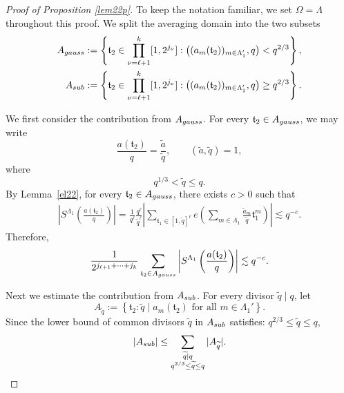 \documentclass[10pt,a4paper]{amsart}
\numberwithin{equation}{section}
\begin{document}
 \begin{proof}[Proof of Proposition \ref{lem22p}] To keep the notation familiar, we set $\Omega=\Lambda$ throughout this proof.
	We split the averaging domain into the two subsets
	\begin{align*}
		A_{\rm gauss}
		&:=
		\left\{
		\mathfrak{t}_2\in
		\prod_{\nu=\ell+1}^k[1,2^{j_\nu}]
		:
		\bigl((a_m(\mathfrak{t}_2))_{m\in\Lambda_1'},q\bigr)
		<
		q^{2/3}
		\right\},\\
		A_{\rm sub}
		&:=
		\left\{
		\mathfrak{t}_2\in
		\prod_{\nu=\ell+1}^k[1,2^{j_\nu}]
		:
		\bigl((a_m(\mathfrak{t}_2))_{m\in\Lambda_1'},q\bigr)
		\ge
		q^{2/3}
		\right\}.
	\end{align*}
	
	We first consider the contribution from $A_{\rm gauss}$.
	For every $\mathfrak t_2\in A_{\rm gauss}$, we may write
	\[
	\frac{a(\mathfrak t_2)}{q}
	=
	\frac{\widetilde a}{\widetilde q},
	\qquad
	(\widetilde a,\widetilde q)=1,
	\]
	where
	\[
	q^{1/3}< \widetilde q\le q.
	\]
By	 Lemma~\ref{el22}, for every $\mathfrak t_2\in A_{\rm gauss}$, there exists $c>0$ such that
	\begin{align*}
		\left|
		S^{\Lambda_1}
		\left(
		\frac{a(\mathfrak t_2)}{q}
		\right)
		\right|
		=
		\frac1{q^\ell}
		\frac{q^\ell}{\widetilde q^\ell}
		\left|
		\sum_{\mathfrak t_1\in[1,\widetilde q]^\ell}
		e\!\left(
		\sum_{m\in\Lambda_1}
		\frac{\widetilde a_m}{\widetilde q}
		\mathfrak t_1^m
		\right)
		\right|   
		\lesssim q^{-c}.
	\end{align*}
	Therefore,
	\begin{align}\label{4040}
		\frac1{2^{j_{\ell+1}+\cdots+j_k}}
		\sum_{\mathfrak t_2\in A_{\rm gauss}}
		\left|
		S^{\Lambda_1}
		\left(
		\frac{a(\mathfrak t_2)}{q}
		\right)
		\right|
		\lesssim
	q^{-c}.
	\end{align}
	
	Next we estimate the contribution from $A_{\rm sub}$.
	For every divisor $\widetilde q\mid q$, let
	\[
	A_{\widetilde q}
	:=
	\left\{
	\mathfrak t_2:
	\widetilde q
	\mid
	a_m(\mathfrak t_2)
	\text{ for all }
	m\in\Lambda_1'
	\right\}.
	\]
	Since the lower bound of common divisors $\widetilde q$  in $ A_{\rm sub}$ satisfies:
	$q^{2/3}\le\widetilde q\le q$, 
	\[
	|A_{\rm sub}|
	\le
	\sum_{\substack{\widetilde q\mid q\\
			q^{2/3}\le\widetilde q\le q}}
	|A_{\widetilde q}|.
	\]
	

\end{proof}
\end{document}
